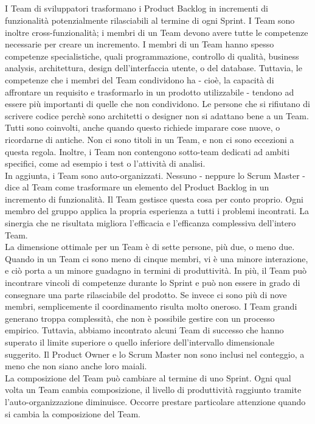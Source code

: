 \subsection*{\color{Blue}{IL TEAM}}
\label{sec:team}
I Team di sviluppatori trasformano i Product Backlog in incrementi di funzionalit\`a potenzialmente rilasciabili al
termine di ogni Sprint. I Team sono inoltre cross-funzionalit\`a; i membri di un Team devono avere tutte le competenze
necessarie per creare un incremento. I membri di un Team hanno spesso competenze specialistiche, quali programmazione,
controllo di qualit\`a, business analysis, architettura, design dell'interfaccia utente, o del database. Tuttavia, le
competenze che i membri del Team condividono ha - cio\`e, la capacit\`a di affrontare un requisito e trasformarlo in un
prodotto utilizzabile - tendono ad essere pi\`u importanti di quelle che non condividono. Le persone che si rifiutano
di scrivere codice perch\`e sono architetti o designer non si adattano bene a un Team. Tutti sono coinvolti, anche
quando questo richiede imparare cose nuove, o ricordarne di antiche. Non ci sono titoli in un Team, e non ci sono
eccezioni a questa regola. Inoltre, i Team non contengono sotto-team dedicati ad ambiti specifici, come ad esempio i
test o l'attivit\`a di analisi.\\ 
\linebreak In aggiunta, i Team sono auto-organizzati. Nessuno - neppure lo Scrum
Master - dice al Team come trasformare un elemento del Product Backlog in un incremento di funzionalit\`a. Il Team
gestisce questa cosa per conto proprio. Ogni membro del gruppo applica la propria esperienza a tutti i problemi
incontrati. La sinergia che ne risultata migliora l'efficacia e l'efficanza complessiva dell'intero Team.\\ 
\linebreak
La dimensione ottimale per un Team \`e di sette persone, pi\`u due, o meno due. Quando in un Team ci sono meno di
cinque membri, vi \`e una minore interazione, e ci\`o porta a un minore guadagno in termini di produttivit\`a. In
pi\`u, il Team pu\`o incontrare vincoli di competenze durante lo Sprint e pu\`o non essere in grado di consegnare una
parte rilasciabile del prodotto. Se invece ci sono pi\`u di nove membri, semplicemente il coordinamento risulta molto
oneroso. I Team grandi generano troppa complessit\`a, che non \`e possibile gestire con un processo empirico. Tuttavia,
abbiamo incontrato alcuni Team di successo che hanno superato il limite superiore o quello inferiore dell'intervallo
dimensionale suggerito. Il Product Owner e lo Scrum Master non sono inclusi nel conteggio, a meno che non siano anche
loro maiali.\\ 
\linebreak La composizione del Team pu\`o cambiare al termine di uno Sprint. Ogni qual volta un Team
cambia composizione, il livello di produttivit\`a raggiunto tramite l'auto-organizzazione diminuisce. Occorre prestare
particolare attenzione quando si cambia la composizione del Team.